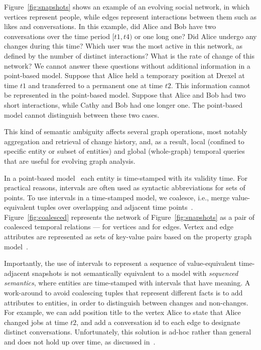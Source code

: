 Figure~\ref{fig:snapshots} shows an example of an evolving social
network, in which vertices represent people, while edges represent
interactions between them such as likes and conversations.  In this
example, did Alice and Bob have two conversations over the time period
$[t1, t4)$ or one long one?  Did Alice undergo any changes during this
  time?  Which user was the most active in this network, as defined by
  the number of distinct interactions? What is the rate of change of
  this network?  We cannot answer these questions without additional
  information in a point-based model.  Suppose that Alice held a
  temporary position at Drexel at time $t1$ and transferred to a
  permanent one at time $t2$.  This information cannot be represented
  in the point-based model.  Suppose that Alice and Bob had two short
  interactions, while Cathy and Bob had one longer one.  The
  point-based model cannot distinguish between these two cases.

This kind of semantic ambiguity affects several graph operations, most
notably aggregation and retrieval of change history, and, as a result,
local (confined to specific entity or subset of entities) and global
(whole-graph) temporal queries that are useful for evolving graph
analysis.

In a point-based model~\cite{Toman2009} each entity is time-stamped
with its validity time.  For practical reasons, intervals are often
used as syntactic abbreviations for sets of points.  To use intervals
in a time-stamped model, we coalesce, i.e., merge value-equivalent
tuples over overlapping and adjacent time points~\cite{Bohlen09}.
Figure~\ref{fig:coalesced} represents the network of
Figure~\ref{fig:snapshots} as a pair of coalesced temporal relations
---  for vertices and  for edges.  Vertex and edge
attributes are represented as sets of key-value pairs based on the
property graph model~\cite{Angles2008}.

Importantly, the use of intervals to represent a sequence of
value-equivalent time-adjacent snapshots is not semantically
equivalent to a model with {\em sequenced semantics}, where entities
are time-stamped with intervals that have meaning.\eat{ Note that
  Alice shows no changes during the whole time interval, with a single
  tuple over $[t1, t4)$.  Similarly, two interactions between Alice
    and Bob are coalesced into one.} A work-around to avoid coalescing
  tuples that represent different facts is to add attributes to
  entities, in order to distinguish between changes and non-changes.
  For example, we can add position title to the vertex Alice to state
  that Alice changed jobs at time $t2$, and add a conversation id to
  each edge to designate distinct conversations.  Unfortunately, this
  solution is ad-hoc rather than general and does not hold up over
  time, as discussed in~\cite{Bohlen1998}.

